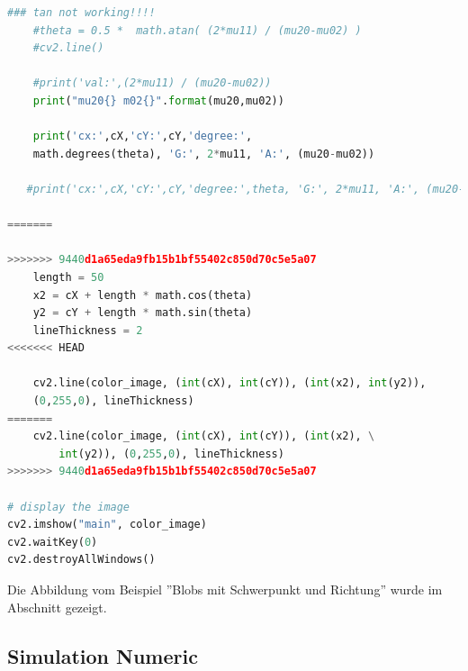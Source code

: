 \documentclass[a4paper]{report}
\begin{document}
\begin{lstlisting}[language=Python, caption=Simulation in OpenCV]
    ### tan not working!!!!
    #theta = 0.5 *  math.atan( (2*mu11) / (mu20-mu02) )
    #cv2.line()
    
    #print('val:',(2*mu11) / (mu20-mu02))
    print("mu20{} m02{}".format(mu20,mu02))
   
    print('cx:',cX,'cY:',cY,'degree:',
    math.degrees(theta), 'G:', 2*mu11, 'A:', (mu20-mu02))
    
   #print('cx:',cX,'cY:',cY,'degree:',theta, 'G:', 2*mu11, 'A:', (mu20-mu02))
    
=======
      
>>>>>>> 9440d1a65eda9fb15b1bf55402c850d70c5e5a07
    length = 50
    x2 = cX + length * math.cos(theta)
    y2 = cY + length * math.sin(theta) 
    lineThickness = 2
<<<<<<< HEAD
   
    cv2.line(color_image, (int(cX), int(cY)), (int(x2), int(y2)), 
    (0,255,0), lineThickness)
=======
    cv2.line(color_image, (int(cX), int(cY)), (int(x2), \
    	int(y2)), (0,255,0), lineThickness)
>>>>>>> 9440d1a65eda9fb15b1bf55402c850d70c5e5a07
    
# display the image
cv2.imshow("main", color_image)
cv2.waitKey(0)    
cv2.destroyAllWindows()
\end{lstlisting}

Die Abbildung vom Beispiel ''Blobs mit Schwerpunkt und Richtung'' wurde im  Abschnitt \textbf{ } gezeigt.\\

\subsection{Simulation Numeric}
\end{document}

